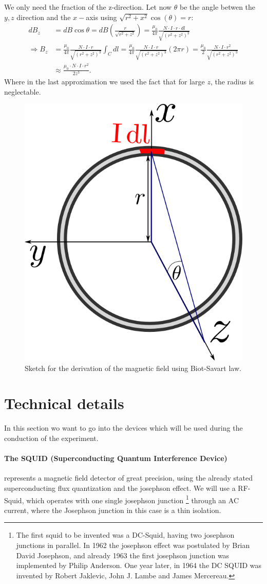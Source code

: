 We only need the fraction of the z-direction. Let now $\theta$ be the angle betwen the $y,z$ 
direction and the $x-$axis using $\sqrt{{r}^2 + x^2} \cos(\theta) = {r}$:
\begin{align}
     dB_z &= dB \cos\theta = dB \left (\frac{{r}}{\sqrt{{r}^2 + z^2}} \right) = 
    \frac{\mu_0}{4\pi} \frac{N\cdot I  \cdot {r} \cdot dl}{\sqrt{\left ({r}^2 + z^2 \right )^3}} \\
\Rightarrow B_z &= \frac{\mu_0}{4\pi} \frac{N\cdot I  \cdot {r}}{\sqrt{\left ({r}^2 + z^2 \right )^3}} \int_C dl 
  = \frac{\mu_0}{4\pi} \frac{N\cdot I  \cdot {r}}{\sqrt{\left ({r}^2 + z^2 \right )^3}} \left (2\pi {r} \right )
  =  \frac{\mu_0}{2} \frac{N\cdot I  \cdot {r}^2}{\sqrt{\left ({r}^2 + z^2 \right )^3}} \\
  &\approx \frac{\mu_0\cdot N \cdot I \cdot r^2}{2z^3}. \label{eq:aprox1}
\end{align}
Where in the last approximation we used the fact that for large $z$, the
radius is neglectable.
\begin{figure}[htpb]
    \centering
    \includegraphics[width=0.4\linewidth]{figures/magnetic_field}
    \caption{Sketch for the derivation of the magnetic field using Biot-Savart law.}
    \label{fig:magnetic_field}
\end{figure}
\section{Technical details}
\label{sec:technics}
In this section wo want to go into the devices which will be used during the
conduction of the experiment.
\paragraph{The SQUID (Superconducting Quantum Interference Device)} represents a magnetic field
detector of great precision, using the already stated superconducting flux quantization and
the josephson effect. We will use a RF-Squid, which operates with one single josephson junction
\footnote{The first squid to be invented was a DC-Squid, having two josephson junctions in parallel. In 1962
the josephson effect was postulated by Brian David Josephson, and already 1963 the first josephson junction
was implemented by Philip Anderson. One year later, in 1964 the DC SQUID was invented by Robert Jaklevic, John J. Lambe
and James Mercereau.} through an AC current, where the Josephson junction in this case is a thin isolation.
